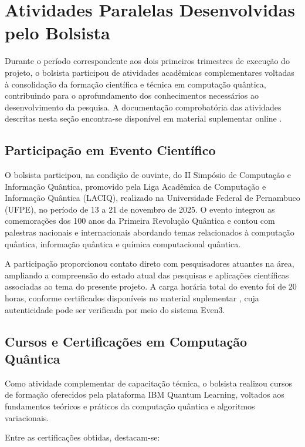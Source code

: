 \section{Atividades Paralelas Desenvolvidas pelo Bolsista}

Durante o período correspondente aos dois primeiros trimestres de execução
do projeto, o bolsista participou de atividades acadêmicas complementares
voltadas à consolidação da formação científica e técnica em computação
quântica, contribuindo para o aprofundamento dos conhecimentos necessários
ao desenvolvimento da pesquisa. A documentação comprobatória das atividades
descritas nesta seção encontra-se disponível em material suplementar online
\cite{leao2026material_suplementar}.

\subsection{Participação em Evento Científico}

O bolsista participou, na condição de ouvinte, do II Simpósio de Computação
e Informação Quântica, promovido pela Liga Acadêmica de Computação e
Informação Quântica (LACIQ), realizado na Universidade Federal de Pernambuco
(UFPE), no período de 13 a 21 de novembro de 2025. O evento integrou as
comemorações dos 100 anos da Primeira Revolução Quântica e contou com
palestras nacionais e internacionais abordando temas relacionados à
computação quântica, informação quântica e química computacional quântica.

A participação proporcionou contato direto com pesquisadores atuantes na
área, ampliando a compreensão do estado atual das pesquisas e aplicações
científicas associadas ao tema do presente projeto. A carga horária total
do evento foi de 20 horas, conforme certificados disponíveis no material
suplementar \cite{leao2026material_suplementar}, cuja autenticidade pode
ser verificada por meio do sistema Even3.

\subsection{Cursos e Certificações em Computação Quântica}

Como atividade complementar de capacitação técnica, o bolsista realizou
cursos de formação oferecidos pela plataforma IBM Quantum Learning,
voltados aos fundamentos teóricos e práticos da computação quântica e
algoritmos variacionais.

Entre as certificações obtidas, destacam-se:

